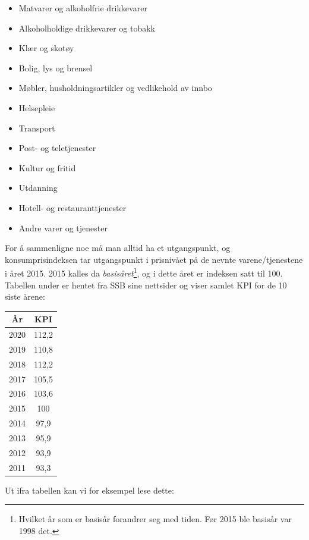 \parbox[t]{0.49\linewidth}{\begin{itemize}
		\item Matvarer og alkoholfrie drikkevarer
		\item Alkoholholdige drikkevarer og tobakk
		\item Klær og skotøy
		\item Bolig, lys og brensel
		\item Møbler, husholdningsartikler og vedlikehold av innbo
		\item Helsepleie
\end{itemize}}
\parbox[t]{0.49\linewidth}{\begin{itemize}
		\item Transport
		\item Post- og teletjenester
		\item Kultur og fritid
		\item Utdanning
		\item Hotell- og restauranttjenester
		\item Andre varer og tjenester
\end{itemize}}
For å sammenligne noe må man alltid ha et utgangspunkt, og konsumprisindeksen tar utgangspunkt i prisnivået på de nevnte varene/tjenestene i året 2015. 2015 kalles da \textit{basisåret}\footnote{Hvilket år som er basisår forandrer seg med tiden. Før 2015 ble basisår var 1998 det.}, og i dette året er indeksen satt til 100.\regv
{}\regv
Tabellen under er hentet fra SSB sine nettsider og viser samlet KPI for de 10 siste årene:
\begin{center}
	\begin{tabular}{c|c}
		År &  KPI \\ \hline
		2020 & 112,2\\
		2019 & 	110,8\\
		2018 &  112,2 \\
		2017&	105,5\\
		2016&	103,6\\
		2015&	100\\
		2014&	97,9\\
		2013&	95,9\\
		2012&	93,9\\
		2011&	93,3\\
	\end{tabular}
\end{center}
Ut ifra tabellen kan vi for eksempel lese dette:
